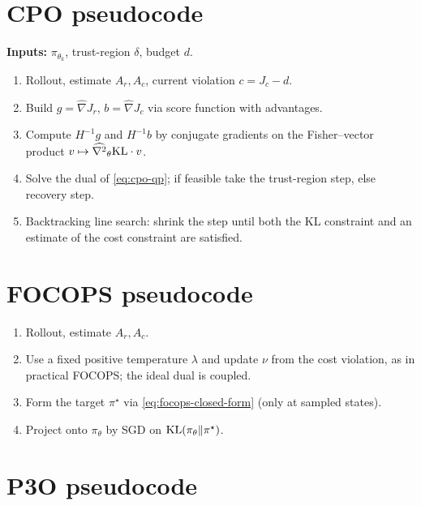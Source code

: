 \documentclass[11pt,oneside]{scrbook}
\begin{document}
\section{CPO pseudocode}

\begin{tcolorbox}[colback=mintedbg, colframe=rlgray!50, title=\textbf{Algorithm: CPO (one update)}]
\textbf{Inputs:} $\pi_{\theta_k}$, trust-region $\delta$, budget $d$.
\begin{enumerate}[leftmargin=*]
  \item Rollout, estimate $A_r, A_c$, current violation $c = J_c - d$.
  \item Build $g = \widehat{\nabla} J_r$, $b = \widehat{\nabla} J_c$ via score
        function with advantages.
  \item Compute $H^{-1} g$ and $H^{-1} b$ by conjugate gradients on the
        Fisher--vector product $v \mapsto \widehat{\nabla^2}_\theta \mathrm{KL} \cdot v$.
  \item Solve the dual of \cref{eq:cpo-qp}; if feasible take the trust-region
        step, else recovery step.
  \item Backtracking line search: shrink the step until both the KL
        constraint and an estimate of the cost constraint are satisfied.
\end{enumerate}
\end{tcolorbox}

\section{FOCOPS pseudocode}

\begin{tcolorbox}[colback=mintedbg, colframe=rlgray!50, title=\textbf{Algorithm: FOCOPS (one update)}]
\begin{enumerate}[leftmargin=*]
  \item Rollout, estimate $A_r, A_c$.
  \item Use a fixed positive temperature $\lambda$ and update $\nu$ from the cost violation, as in practical FOCOPS; the ideal dual is coupled.
  \item Form the target $\pi^\star$ via \cref{eq:focops-closed-form}
        (only at sampled states).
  \item Project onto $\pi_\theta$ by SGD on $\mathrm{KL}(\pi_\theta \Vert \pi^\star)$.
\end{enumerate}
\end{tcolorbox}

\section{P3O pseudocode}
\end{document}
